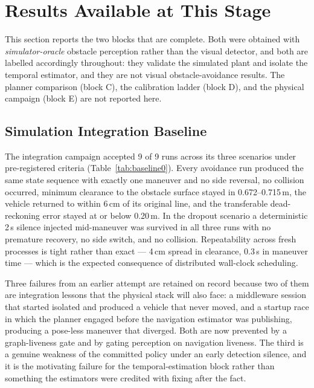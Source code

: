 \section{Results Available at This Stage}
\label{sec:results}

This section reports the two blocks that are complete. Both were obtained
with \emph{simulator-oracle} obstacle perception rather than the visual
detector, and both are labelled accordingly throughout: they validate the
simulated plant and isolate the temporal estimator, and they are not visual
obstacle-avoidance results. The planner comparison (block C), the calibration
ladder (block D), and the physical campaign (block E) are not reported here.

\subsection{Simulation Integration Baseline}

The integration campaign accepted 9 of 9 runs across its three scenarios
under pre-registered criteria (Table~\ref{tab:baseline0}). Every avoidance
run produced the same state sequence with exactly one maneuver and no side
reversal, no collision occurred, minimum clearance to the obstacle surface
stayed in 0.672--0.715\,m, the vehicle returned to within 6\,cm of its
original line, and the transferable dead-reckoning error stayed at or below
0.20\,m. In the dropout scenario a deterministic 2\,s silence injected
mid-maneuver was survived in all three runs with no premature recovery, no
side switch, and no collision. Repeatability across fresh processes is tight
rather than exact --- 4\,cm spread in clearance, 0.3\,s in maneuver time ---
which is the expected consequence of distributed wall-clock scheduling.



Three failures from an earlier attempt are retained on record because two of
them are integration lessons that the physical stack will also face: a
middleware session that started isolated and produced a vehicle that never
moved, and a startup race in which the planner engaged before the navigation
estimator was publishing, producing a pose-less maneuver that diverged. Both
are now prevented by a graph-liveness gate and by gating perception on
navigation liveness. The third is a genuine weakness of the committed policy
under an early detection silence, and it is the motivating failure for the
temporal-estimation block rather than something the estimators were credited
with fixing after the fact.

